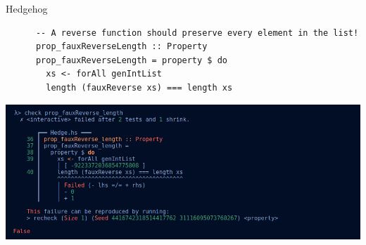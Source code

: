   \begin{frame}[fragile]{Hedgehog}
      \begin{verbatim}
      -- A reverse function should preserve every element in the list!
      prop_fauxReverseLength :: Property
      prop_fauxReverseLength = property $ do
        xs <- forAll genIntList
        length (fauxReverse xs) === length xs 
      \end{verbatim}
     
      \begin{center}
      \includegraphics[width= 1.0\textwidth]{images/hedgehog_faux_reverse_length_output.png}
      \end{center} 
  \end{frame}